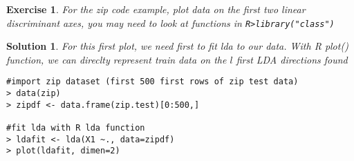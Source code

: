 \documentclass[12pt,a4paper]{article}
\newtheorem{exercise}{Exercise}
\newtheorem{solution}{Solution}
\begin{document}
\begin{exercise}
For the zip code example, plot data on the first two linear discriminant axes, 
 you may need to look at functions in \texttt{R>library("class")}
\end{exercise}
\begin{solution}

For this first plot, we need first to fit lda to our data. With R plot() function, we can direclty represent train data on the $l$ first LDA directions found
\begin{verbatim}
#import zip dataset (first 500 first rows of zip test data)
> data(zip)
> zipdf <- data.frame(zip.test)[0:500,]

#fit lda with R lda function
> ldafit <- lda(X1 ~., data=zipdf)
> plot(ldafit, dimen=2)
\end{verbatim}
\end{solution}
\end{document}
